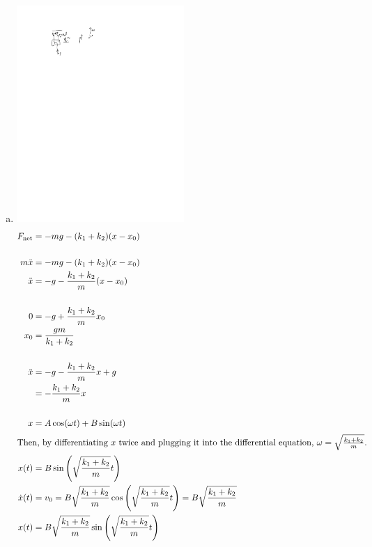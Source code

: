 \documentclass{esg8012pset}
\begin{document}
\begin{solution}
  \begin{enumerate}[a)]
    \item \includegraphics[width=0.5\textwidth]{2009-10-02_Diagram_5_1}\begin{align*}
     F_{\text{net}} & = -mg -(k_1 + k_2)(x - x_0) \\
     \\
     m\ddot x & = -mg -(k_1 + k_2)(x - x_0) \\
     \ddot x & = -g -\frac{k_1 + k_2}{m}(x - x_0) \\
     \\
     0 & = -g + \frac{k_1 + k_2}{m}x_0 \\
     x_0 & = \frac{gm}{k_1 + k_2} \\
     \\
     \ddot x & = -g - \frac{k_1 + k_2}{m}x + g \\
      & = -\frac{k_1 + k_2}{m}x\\
      \\
      x & = A\cos(\omega t) + B\sin(\omega t) \\
      \intertext{Then, by differentiating $x$ twice and plugging it into the differential equation, $\omega = \sqrt{\frac{k_1 + k_2}{m}}$.}
      x(t) & = B\sin\left(\sqrt{\frac{k_1 + k_2}{m}}t\right) \\
      \dot x(t) & = v_0 = B\sqrt{\frac{k_1 + k_2}{m}}\cos\left(\sqrt{\frac{k_1 + k_2}{m}}t\right) = B\sqrt{\frac{k_1 + k_2}{m}} \\
      x(t) & = B\sqrt{\frac{k_1 + k_2}{m}}\sin\left(\sqrt{\frac{k_1 + k_2}{m}}t\right) \\
      \\

\end{align*}
\end{enumerate}
\end{solution}
\end{document}
